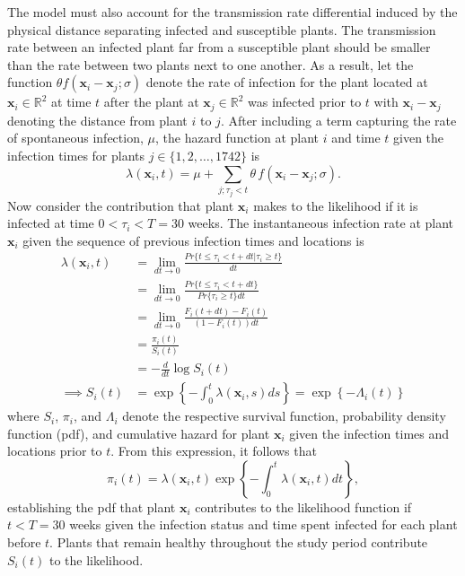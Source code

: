 \documentclass{uwstat572}
\begin{document}
The model must also account for the transmission rate differential induced by the physical distance separating infected and susceptible plants. 
The transmission rate between an infected plant far from a susceptible plant should be smaller than the rate between two plants next to one another.
As a result, let the function $\theta f(\boldsymbol{x}_i -\boldsymbol{x}_j; \sigma)$ denote the rate of infection for the plant located at $\boldsymbol{\boldsymbol{x}}_i \in \mathbb{R}^2$ at time $t$ after the plant at $\boldsymbol{x}_j \in \mathbb{R}^2$ was infected prior to $t$ with $\boldsymbol{x}_i -\boldsymbol{x}_j$ denoting the distance from plant $i$ to $j$. 
After including a term capturing the rate of spontaneous infection, $\mu$, the hazard function at plant $i$ and time $t$ given the infection times for plants $j \in \{1, 2, \dots, 1742\}$ is 
$$\lambda(\boldsymbol{x}_i,t) = \mu + \sum_{j; \tau_j<t} \theta \, f(\boldsymbol{x}_i - \boldsymbol{x}_j; \sigma).$$
Now consider the contribution that plant $\boldsymbol{x}_i$ makes to the likelihood if it is infected at time $0<\tau_i<T=30$ weeks. 
The instantaneous infection rate at plant $\boldsymbol{x}_i$ given the sequence of previous infection times and locations is
\begin{align*}
\lambda(\boldsymbol{x}_i, t) &= \lim_{dt \to 0} \frac{Pr\{ t \le \tau_i < t+dt | \tau_i \ge t \}}{dt} \\
	&= \lim_{dt \to 0} \frac{Pr\{ t \le \tau_i < t+dt\}}{Pr\{\tau_i\ge t\}dt}\\
	&= \lim_{dt \to 0} \frac{F_i(t+dt) - F_i(t)}{(1-F_i(t))dt} \\
	&= \frac{\pi_i(t)}{S_i(t)}\\
	&= -\frac{d}{dt} \log S_i(t) \\
\implies S_i(t) &= \exp \left\{ - \int_0^t \lambda(\boldsymbol{x}_i,s) ds  \right\} = \exp \left\{ - \Lambda_i(t)  \right\}
\end{align*}
where $S_i$, $\pi_i$, and $\Lambda_i$ denote the respective survival function, probability density function (pdf), and cumulative hazard for plant $\boldsymbol{x}_i$ given the infection times and locations prior to $t$. 
From this expression, it follows that
$$ \pi_i(t) = \lambda(\boldsymbol{x}_i,t) \exp \left\{ - \int_0^t \lambda(\boldsymbol{x}_i,t) dt  \right\},$$
establishing the pdf that plant $\boldsymbol{x}_i$ contributes to the likelihood function if $t<T=30$ weeks given the infection status and time spent infected for each plant before $t$. 
Plants that remain healthy throughout the study period contribute $S_i(t)$ to the likelihood. 
\end{document}
